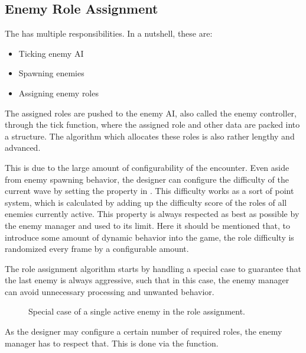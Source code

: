 \documentclass[../Main.tex]{subfiles}
\begin{document}
\subsection{Enemy Role Assignment}\label{sec:enemy-role-assignment}

The  has multiple responsibilities. In a nutshell, these are:

\begin{itemize}
    \item Ticking enemy AI
    \item Spawning enemies
    \item Assigning enemy roles
\end{itemize}

The assigned roles are pushed to the enemy AI, also called the enemy controller, through the tick function, where the assigned role and other data are packed into a structure. The algorithm which allocates these roles is also rather lengthy and advanced.

This is due to the large amount of configurability of the encounter. Even aside from enemy spawning behavior, the designer can configure the difficulty of the current wave by setting the  \linebreak{} property in . This difficulty works as a sort of point system, which is calculated by adding up the difficulty score of the roles of all enemies currently active. This property is always respected as best as possible by the enemy manager and used to its limit. Here it should be mentioned that, to introduce some amount of dynamic behavior into the game, the role difficulty is randomized every frame by a configurable amount.

The role assignment algorithm starts by handling a special case to guarantee that the last enemy is always aggressive, such that in this case, the enemy manager can avoid unnecessary processing and unwanted behavior.

\begin{figure}[H]
    \centering
    
    \caption[Special case of a single active enemy in the role assignment. Own figure.]{Special case of a single active enemy in the role assignment.}
    \label{fig:roles-single-enemy}
\end{figure}

As the designer may configure a certain number of required roles, the enemy manager has to respect that. This is done via the  function.
\end{document}
